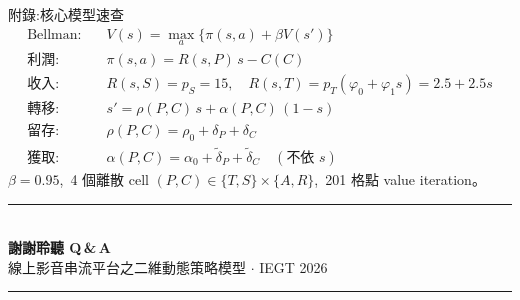 \documentclass[aspectratio=169,11pt,fontset=none]{ctexbeamer}
\begin{document}
\appendix
\begin{frame}{附錄:核心模型速查}
  \small
  \begin{align*}
    \text{Bellman:}\quad & V(s)=\max_{a}\{\pi(s,a)+\beta V(s')\}\\
    \text{利潤:}\quad & \pi(s,a)=R(s,P)\,s-C(C)\\
    \text{收入:}\quad & R(s,S)=p_S=15,\quad R(s,T)=p_T(\varphi_0+\varphi_1 s)=2.5+2.5s\\
    \text{轉移:}\quad & s'=\rho(P,C)\,s+\alpha(P,C)\,(1-s)\\
    \text{留存:}\quad & \rho(P,C)=\rho_0+\delta_P+\delta_C\\
    \text{獲取:}\quad & \alpha(P,C)=\alpha_0+\tilde\delta_P+\tilde\delta_C\quad(\text{不依 } s)
  \end{align*}
  \centering $\beta=0.95$,\ 4 個離散 cell $(P,C)\in\{T,S\}\times\{A,R\}$,\ 201 格點 value iteration。
\end{frame}

\begin{frame}[plain]
  \vfill\centering
  {\color{rblue}\rule{0.5\textwidth}{1.4pt}}\\[0.8em]
  {\Large\bfseries\color{rblue} 謝謝聆聽 \quad Q\,\&\,A}\\[0.6em]
  {\footnotesize 線上影音串流平台之二維動態策略模型 $\cdot$ IEGT 2026}\\[0.6em]
  {\color{rblue}\rule{0.5\textwidth}{1.4pt}}
  \vfill
\end{frame}
\end{document}
